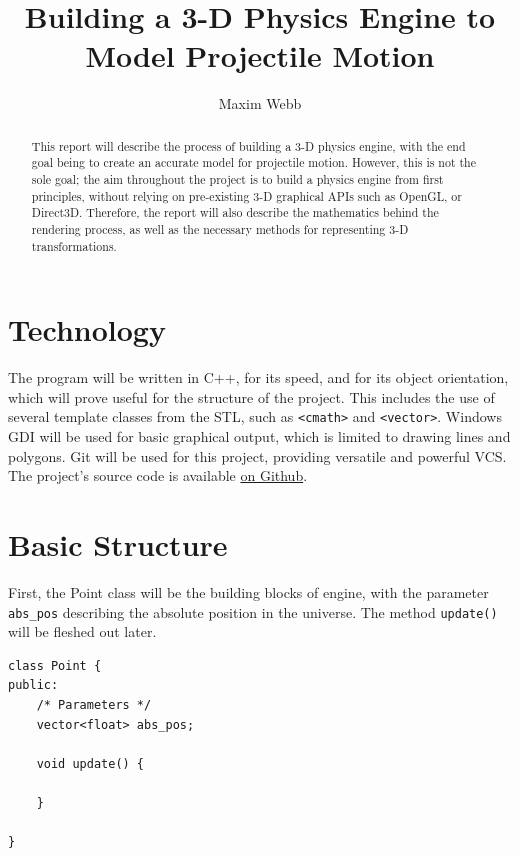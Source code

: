 \documentclass{article}
\title{
	\Huge
	{Building a 3-D Physics Engine to Model Projectile Motion}\\
}
\author{Maxim Webb}
\begin{document}
\maketitle

\newpage

\begin{abstract}
This report will describe the process of building a 3-D physics engine, with the end goal being to create an accurate model for projectile motion.
\newline
\newline
However, this is not the sole goal; the aim throughout the project is to build a physics engine from first principles, without relying on pre-existing 3-D graphical APIs such as OpenGL, or Direct3D. Therefore, the report will also describe the mathematics behind the rendering process, as well as the necessary methods for representing 3-D transformations.
\newline
\end{abstract}
\newpage
\tableofcontents

\newpage

\section{Technology}
The program will be written in C++, for its speed, and for its object orientation, which will prove useful for the structure of the project. This includes the use of several template classes from the STL, such as \verb|<cmath>| and \verb|<vector>|.
\newline
\newline
Windows GDI will be used for basic graphical output, which is limited to drawing lines and polygons. 
\newline
\newline
Git will be used for this project, providing versatile and powerful VCS. The project's source code is available 
\href{https://github.com/maximwebb/3D-engine}{\color{blue} on Github}\color{black}.

\newpage
\section{Basic Structure}

First, the Point class will be the building blocks of engine, with the parameter \verb|abs_pos| describing the absolute position in the universe. The method \verb|update()| will be fleshed out later.
\begin{lstlisting}
class Point {
public:
	/* Parameters */
	vector<float> abs_pos;
	
	void update() {
	
	}

}
\end{lstlisting}
\end{document}
